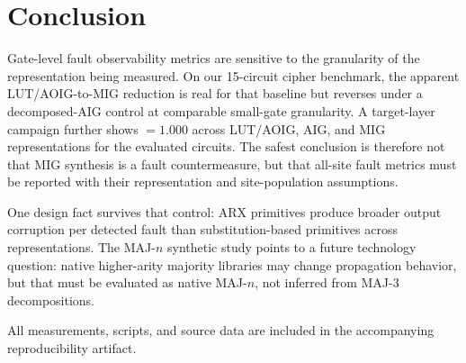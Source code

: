 \section{Conclusion}
\label{sec:conclusion}

Gate-level fault observability metrics are sensitive to the granularity
of the representation being measured. On our 15-circuit cipher
benchmark, the apparent LUT/AOIG-to-MIG \AvgDP{} reduction is real for
that baseline but reverses under a decomposed-AIG control at comparable
small-gate granularity. A
target-layer campaign further shows \AvgDP{} $=1.000$ across LUT/AOIG,
AIG, and MIG representations for the evaluated circuits. The safest
conclusion is therefore not that MIG synthesis is a fault countermeasure,
but that all-site fault metrics must be reported with their
representation and site-population assumptions.

One design fact survives that control: ARX primitives produce broader
output corruption per detected fault than substitution-based primitives
across representations.
The MAJ-$n$ synthetic study points to a future technology question:
native higher-arity majority libraries may change propagation behavior,
but that must be evaluated as native MAJ-$n$, not inferred from MAJ-3
decompositions.

All measurements, scripts, and source data are included in the
accompanying reproducibility artifact.
